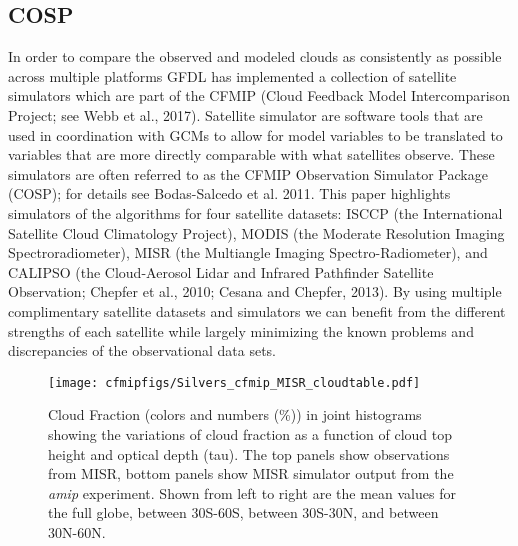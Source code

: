 \documentclass[draft]{agujournal2019}
\begin{document}
\subsection{COSP}
In order to compare the observed and modeled clouds as consistently as possible across multiple platforms 
GFDL has implemented a collection of satellite simulators which are part of the 
CFMIP (Cloud Feedback Model Intercomparison Project; see Webb et al., 2017).  Satellite simulator
are software tools that are used in coordination with GCMs to allow for model variables 
to be translated to variables that are more directly comparable with what satellites observe.  
These simulators are often referred to as the CFMIP Observation Simulator Package (COSP); for
details see Bodas-Salcedo et al. 2011.  This paper highlights simulators of the algorithms for 
four satellite datasets: ISCCP (the International Satellite Cloud Climatology Project), 
MODIS (the Moderate Resolution Imaging Spectroradiometer), 
MISR (the Multiangle Imaging Spectro-Radiometer), and 
CALIPSO (the Cloud-Aerosol Lidar and Infrared Pathfinder Satellite Observation; 
Chepfer et al., 2010; Cesana and Chepfer, 2013).  By using multiple complimentary satellite 
datasets and simulators we can benefit from the different strengths of each satellite while largely 
minimizing the known problems and discrepancies of the observational data sets.      

\begin{figure}
  \centering
  \texttt{[image: cfmipfigs/Silvers\_cfmip\_MISR\_cloudtable.pdf]}
  \caption{Cloud Fraction (colors and numbers (\%)) in joint histograms showing the variations of cloud fraction 
  as a function of cloud top height and optical depth (tau).
  The top panels show observations from MISR, bottom panels show MISR simulator output from the 
  \textit{amip} experiment.  Shown from left to right are the mean values for the full globe, between 30S-60S,
  between 30S-30N, and between 30N-60N.}
  \label{fig:misr_sim_vs_mod}
\end{figure}
\end{document}
